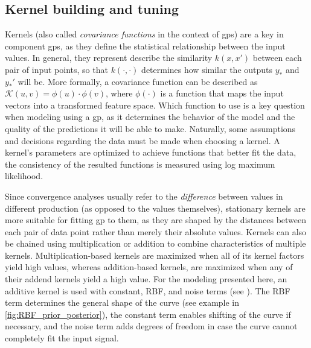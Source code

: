 \subsection{Kernel building and tuning}
\label{subsec:covariance_functions}


Kernels (also called \textit{covariance functions} in the context of \acp{gp}) are a key in component \acp{gp}, as they define the statistical relationship between the input values.
In general, they represent describe the similarity $k(x, x')$ between each pair of input points, so that $k(\cdot, \cdot)$ determines how similar the outputs $y_*$ and $y_*'$ will be. 
More formally, a covariance function can be described as $\mathcal{K}(u, v) = \phi(u) \cdot \phi(v)$, where $\phi(\cdot)$ is a function that maps the input vectors into a transformed feature space.
Which function to use is a key question when modeling using a \ac{gp}, as it determines the behavior of the model and the quality of the predictions it will be able to make.
Naturally, some assumptions and decisions regarding the data must be made when choosing a kernel.
A kernel's parameters are optimized to achieve functions that better fit the data, the consistency of the resulted functions is measured using log maximum likelihood.

Since convergence analyses usually refer to the \textit{difference} between values in different production (as opposed to the values themselves), stationary kernels are more suitable for fitting \ac{gp} to them, as they are shaped by the distances between each pair of data point rather than merely their absolute values.
Kernels can also be chained using multiplication or addition to combine characteristics of multiple kernels.
Multiplication-based kernels are maximized when all of its kernel factors yield high values, whereas
addition-based kernels, are maximized when any of their addend kernels yield a high value.
For the modeling presented here, an additive kernel is used with constant, RBF, and noise terms (see ).
The RBF term determines the general shape of the curve (see example in \cref{fig:RBF_prior_posterior}), the constant term enables shifting of the curve if necessary, and the noise term adds degrees of freedom in case the curve cannot completely fit the input signal.

